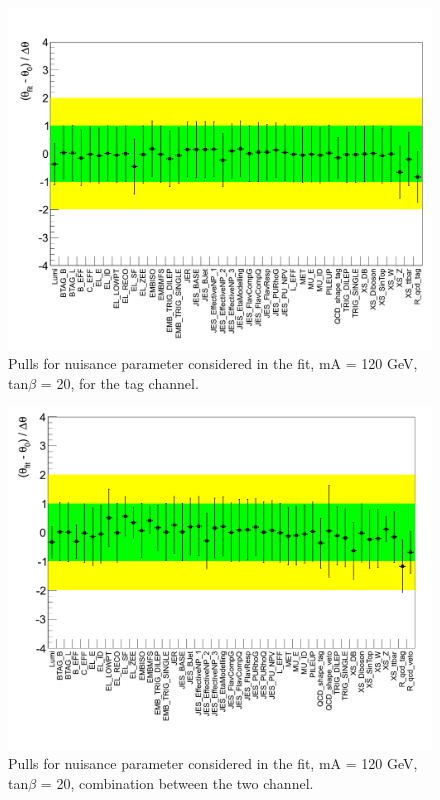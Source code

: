 \begin{figure}[htp]
     \begin{center}

            \includegraphics[width=\textwidth]{figure/np_check/pull_tag.png}
    \end{center}
    \caption{ Pulls for nuisance parameter considered in the fit,  mA = 120 GeV, tan$\beta$ = 20, for the tag  channel.} 
    \label{fig:np_pull_tag}
\end{figure}


\begin{figure}[htp]
     \begin{center}

            \includegraphics[width=\textwidth]{figure/np_check/NP_combined.png}
    \end{center}
    \caption{ Pulls for nuisance parameter considered in the fit,  mA = 120 GeV, tan$\beta$ = 20, combination between the two channel.} 
    \label{fig:np_pull_comb}
\end{figure}

